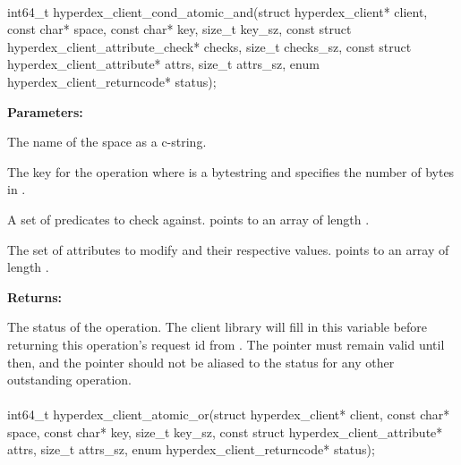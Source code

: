 \paragraph{}
\label{api:c:cond_atomic_and}
\begin{ccode}
int64_t hyperdex_client_cond_atomic_and(struct hyperdex_client* client,
        const char* space,
        const char* key, size_t key_sz,
        const struct hyperdex_client_attribute_check* checks, size_t checks_sz,
        const struct hyperdex_client_attribute* attrs, size_t attrs_sz,
        enum hyperdex_client_returncode* status);
\end{ccode}
\funcdesc 

\noindent\textbf{Parameters:}
\begin{description}[labelindent=\widthof{{\code{checks}, \code{checks\_sz}}},leftmargin=*,noitemsep,nolistsep,align=right]
\item[\code{space}] The name of the space as a c-string.
\item[\code{key}, \code{key\_sz}] The key for the operation where  is a bytestring and  specifies the number of bytes in .
\item[\code{checks}, \code{checks\_sz}] A set of predicates to check against.   points to an array of length .
\item[\code{attrs}, \code{attrs\_sz}] The set of attributes to modify and their respective values.   points to an array of length .
\end{description}

\noindent\textbf{Returns:}
\begin{description}[labelindent=\widthof{{\code{status}}},leftmargin=*,noitemsep,nolistsep,align=right]
\item[\code{status}] The status of the operation.  The client library will fill in this variable before returning this operation's request id from .  The pointer must remain valid until then, and the pointer should not be aliased to the status for any other outstanding operation.
\end{description}

\paragraph{}
\label{api:c:atomic_or}
\begin{ccode}
int64_t hyperdex_client_atomic_or(struct hyperdex_client* client,
        const char* space,
        const char* key, size_t key_sz,
        const struct hyperdex_client_attribute* attrs, size_t attrs_sz,
        enum hyperdex_client_returncode* status);
\end{ccode}
\funcdesc 

